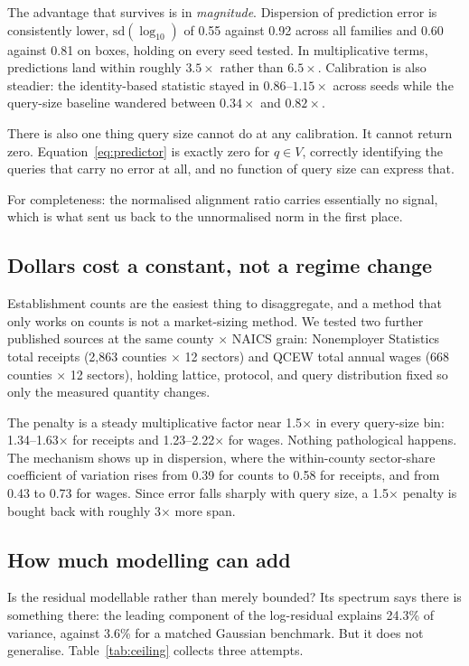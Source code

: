 \documentclass[11pt]{article}
\begin{document}
The advantage that survives is in \emph{magnitude}. Dispersion of prediction
error is consistently lower, $\mathrm{sd}(\log_{10})$ of 0.55 against 0.92 across
all families and 0.60 against 0.81 on boxes, holding on every seed tested. In
multiplicative terms, predictions land within roughly $3.5\times$ rather than
$6.5\times$. Calibration is also steadier: the identity-based statistic stayed in
$0.86$--$1.15\times$ across seeds while the query-size baseline wandered between
$0.34\times$ and $0.82\times$.

There is also one thing query size cannot do at any calibration. It cannot
return zero. Equation~\eqref{eq:predictor} is exactly zero for $q \in V$,
correctly identifying the queries that carry no error at all, and no function of
query size can express that.

For completeness: the normalised alignment ratio carries essentially no signal,
which is what sent us back to the unnormalised norm in the first place.

\subsection{Dollars cost a constant, not a regime change}

Establishment counts are the easiest thing to disaggregate, and a method that
only works on counts is not a market-sizing method. We tested two further
published sources at the same county $\times$ NAICS grain: Nonemployer Statistics
total receipts (2,863 counties $\times$ 12 sectors) and QCEW total annual wages
(668 counties $\times$ 12 sectors), holding lattice, protocol, and query
distribution fixed so only the measured quantity changes.

The penalty is a steady multiplicative factor near 1.5$\times$ in every
query-size bin: 1.34--1.63$\times$ for receipts and 1.23--2.22$\times$ for wages.
Nothing pathological happens. The mechanism shows up in dispersion, where the
within-county sector-share coefficient of variation rises from 0.39 for counts to
0.58 for receipts, and from 0.43 to 0.73 for wages. Since error falls sharply
with query size, a 1.5$\times$ penalty is bought back with roughly 3$\times$ more
span.

\subsection{How much modelling can add}

Is the residual modellable rather than merely bounded? Its spectrum says there is
something there: the leading component of the log-residual explains 24.3\% of
variance, against 3.6\% for a matched Gaussian benchmark. But it does not
generalise. Table~\ref{tab:ceiling} collects three attempts.
\end{document}
